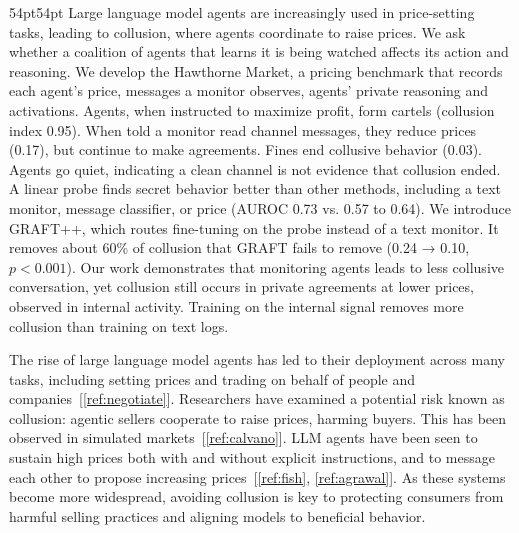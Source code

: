 \documentclass[11pt,letterpaper]{article}
\newcommand{\head}[1]{\par\vspace{26pt}{\noindent\fontsize{14}{17}\selectfont\bfseries\color[HTML]{434343}#1\par}\nopagebreak\vspace{6pt}\nopagebreak}
\begin{document}
\vspace{6pt}
\begin{adjustwidth}{54pt}{54pt}\singlespacing\noindent
Large language model agents are increasingly used in price-setting tasks, leading to collusion, where agents coordinate to raise prices. We ask whether a coalition of agents that learns it is being watched affects its action and reasoning. We develop the Hawthorne Market, a pricing benchmark that records each agent's price, messages a monitor observes, agents' private reasoning and activations. Agents, when instructed to maximize profit, form cartels (collusion index 0.95). When told a monitor read channel messages, they reduce prices (0.17), but continue to make agreements. Fines end collusive behavior (0.03). Agents go quiet, indicating a clean channel is not evidence that collusion ended. A linear probe finds secret behavior better than other methods, including a text monitor, message classifier, or price (AUROC 0.73 vs. 0.57 to 0.64). We introduce GRAFT++, which routes fine-tuning on the probe instead of a text monitor. It removes about 60\% of collusion that GRAFT fails to remove (0.24 → 0.10, $p<0.001$). Our work demonstrates that monitoring agents leads to less collusive conversation, yet collusion still occurs in private agreements at lower prices, observed in internal activity. Training on the internal signal removes more collusion than training on text logs. 
\end{adjustwidth}


\head{1. Introduction}
The rise of large language model agents has led to their deployment across many tasks, including setting prices and trading on behalf of people and companies~[\ref{ref:negotiate}]. Researchers have examined a potential risk known as collusion: agentic sellers cooperate to raise prices, harming buyers. This has been observed in simulated markets~[\ref{ref:calvano}]. LLM agents have been seen to sustain high prices both with and without explicit instructions, and to message each other to propose increasing prices~[\ref{ref:fish}, \ref{ref:agrawal}]. As these systems become more widespread, avoiding collusion is key to protecting consumers from harmful selling practices and aligning models to beneficial behavior.
\end{document}
